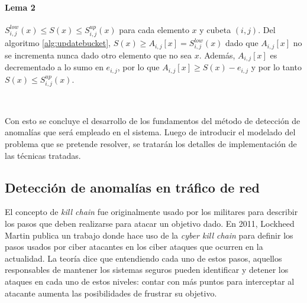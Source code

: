 \documentclass[a4paper,10pt, oneside]{article}
\begin{document}
\paragraph{Lema 2} $S_{i,j}^{low}(x) \leq S(x) \leq S_{i,j}^{up}(x)$ para cada elemento $x$ y cubeta $(i,j)$.
Del algoritmo \ref{alg:updatebucket}, $S(x) \geq A_{i,j}[x] = S_{i,j}^{low}(x)$ dado que $A_{i,j}[x]$ no se incrementa nunca dado otro elemento que no sea $x$. Además,  $A_{i,j}[x]$ es decrementado a lo sumo en $e_{i,j}$, por lo que $A_{i,j}[x] \geq S(x) - e_{i,j}$ y por lo tanto $S(x) \leq S_{i,j}^{up}(x)$.

\

Con esto se concluye el desarrollo de los fundamentos del método de detección de anomalías que será empleado en el sistema. Luego de introducir el modelado del problema que se pretende resolver, se tratarán los detalles de implementación de las técnicas tratadas.

\subsection{Detección de anomalías en tráfico de red}

El concepto de \textit{kill chain} fue originalmente usado por los militares para describir los pasos que deben realizarse para atacar un objetivo dado. En 2011, Lockheed Martin publica un trabajo donde hace uso de la \textit{cyber kill chain}\cite{hutchins2011intelligence} para definir los pasos usados por ciber atacantes en los ciber ataques que ocurren en la actualidad. La teoría dice que entendiendo cada uno de estos pasos, aquellos responsables de mantener los sistemas seguros pueden identificar y detener los ataques en cada uno de estos niveles: contar con más puntos para interceptar al atacante aumenta las posibilidades de frustrar su objetivo.
\end{document}
